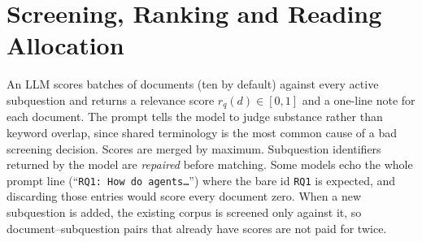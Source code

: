 \documentclass[10pt,a4paper]{article}
\newcommand{\hfont}{\sffamily}
\renewcommand{\paragraph}[1]{%
  \par\vspace{0.35em}{\hfont\bfseries\color{accent}#1}\hspace{0.6em}\ignorespaces}
\newcommand{\code}[1]{\texttt{#1}}
\begin{document}
\section{Screening, Ranking and Reading Allocation}
\label{sec:rank}

\paragraph{Screening.} An LLM scores batches of documents (ten by default)
against every active subquestion and returns a relevance score
$r_q(d)\in[0,1]$ and a one-line note for each document. The prompt tells
the model to judge substance rather than keyword overlap, since shared
terminology is the most common cause of a bad screening decision. Scores
are merged by maximum. Subquestion identifiers returned by the model are
\emph{repaired} before matching. Some models echo the whole prompt line
(``\code{RQ1: How do agents\ldots}'') where the bare id \code{RQ1} is
expected, and discarding those entries would score every document zero.
When a new subquestion is added, the existing corpus is screened only
against it, so document--subquestion pairs that already have scores are
not paid for twice.
\end{document}

